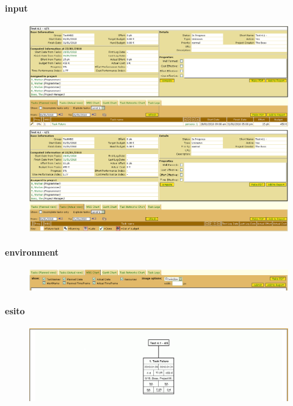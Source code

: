 \paragraph{input}
\begin{figure}
\centering
\includegraphics[width=\textwidth]{tests/TEST_WBS/4.1/4.1_4_5/Esempio_2/input.png}
\includegraphics[width=\textwidth]{tests/TEST_WBS/4.1/4.1_4_5/Esempio_2/input_actual.png}
\end{figure}
\paragraph{environment}
\begin{figure}
\centering
\includegraphics[width=\textwidth]{tests/TEST_WBS/4.1/4.1_4_5/Esempio_2/environment.png}
\end{figure}
\paragraph{esito}
\begin{figure}
\centering
\includegraphics[width=\textwidth]{tests/TEST_WBS/4.1/4.1_4_5/Esempio_2/output.png}
\end{figure}